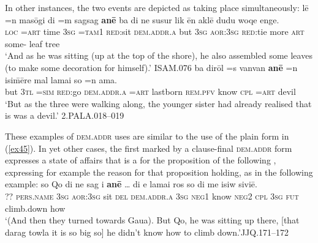 \documentclass[output=paper
,modfonts
,nonflat]{langsci/langscibook}
\begin{document}
\noindent
In other instances, the two events are depicted as taking place simultaneously:
\ea	\label{ex56}
\gll 	l\=e		=n	mas\=ogi	di		=m		sagsag	\textbf{an\=e}		ba		di		ne			susur		lik		\=en		akl\=e	dudu woqe {\textquotesingle}enge.	\\		
	\textsc{loc}	\textsc{=art}	time		\textsc{3sg}	\textsc{=tam1}	\textsc{red:}sit	\textsc{dem.addr.a}	but		\textsc{3sg}	\textsc{aor:3sg}	\textsc{red:}tie	more	\textsc{art}	some-	leaf	tree	\\
\glt	`And as he was sitting (up at the top of the shore), he also assembled some leaves (to make some decoration for himself).'	\hfill{ISAM.076}
\z
\ea	\label{ex57}
\gll		ba 	dir{\textquotesingle}\=ol	=s 		vanvan		\textbf{an\=e}		=n	{\textquotesingle}isi\=m\=ere 	mal 		lama{\textquotesingle}i 	so		=n		{\textquotesingle}ama{\textquotesingle}.\\
		but		\textsc{3tl}	\textsc{=sim}	\textsc{red:}go		\textsc{dem.addr.a}	\textsc{=art}	lastborn		\textsc{rem.pfv}		know		\textsc{cpl}	\textsc{=art}		devil\\
\glt	`But as the three were walking along, the younger sister had already realised that is was a devil.'	\hfill{2.PALA.018--019}
\z

\noindent
These examples of \textsc{dem.addr} uses are similar to the use of the plain form in (\ref{ex45}). In yet other cases, the first  marked by a clause-final \textsc{dem.addr} form expresses a state of affairs that is a  for the proposition of the following , expressing for example the reason for that proposition holding, as in the following example:
\ea	\label{ex58}
\gll		so Qo{\textquotesingle}	di		ne			sag	{\textquotesingle}i		\textbf{an\=e}			{\ob}\dots{\cb}		di		e			lama{\textquotesingle}i		ros		so di		me		{\textquotesingle}isiw				sivi\=e.				\\
		??	\textsc{pers.name}	\textsc{3sg}	\textsc{aor:3sg}	sit	\textsc{del}	\textsc{dem.addr.a}		{}	\textsc{3sg}	\textsc{neg1}	know		\textsc{neg2}	\textsc{cpl}	\textsc{3sg}	\textsc{fut}	climb.down	how		\\
\glt	`(And then they turned towards Gaua). But Qo{\textquotesingle}, he was sitting up there, [that darag towla it is so big so] he didn’t know how to climb down.'\hfill{JJQ.171--172}
\z
\end{document}
